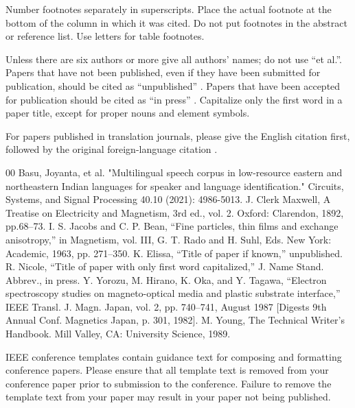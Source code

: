 \documentclass[conference]{IEEEtran}
\begin{document}
Number footnotes separately in superscripts. Place the actual footnote at 
the bottom of the column in which it was cited. Do not put footnotes in the 
abstract or reference list. Use letters for table footnotes.

Unless there are six authors or more give all authors' names; do not use 
``et al.''. Papers that have not been published, even if they have been 
submitted for publication, should be cited as ``unpublished'' \cite{b4}. Papers 
that have been accepted for publication should be cited as ``in press'' \cite{b5}. 
Capitalize only the first word in a paper title, except for proper nouns and 
element symbols.

For papers published in translation journals, please give the English 
citation first, followed by the original foreign-language citation \cite{b6}.

\begin{thebibliography}{00}
 Basu, Joyanta, et al. "Multilingual speech corpus in low-resource eastern and northeastern Indian languages for speaker and language identification." Circuits, Systems, and Signal Processing 40.10 (2021): 4986-5013.
 J. Clerk Maxwell, A Treatise on Electricity and Magnetism, 3rd ed., vol. 2. Oxford: Clarendon, 1892, pp.68--73.
 I. S. Jacobs and C. P. Bean, ``Fine particles, thin films and exchange anisotropy,'' in Magnetism, vol. III, G. T. Rado and H. Suhl, Eds. New York: Academic, 1963, pp. 271--350.
 K. Elissa, ``Title of paper if known,'' unpublished.
 R. Nicole, ``Title of paper with only first word capitalized,'' J. Name Stand. Abbrev., in press.
 Y. Yorozu, M. Hirano, K. Oka, and Y. Tagawa, ``Electron spectroscopy studies on magneto-optical media and plastic substrate interface,'' IEEE Transl. J. Magn. Japan, vol. 2, pp. 740--741, August 1987 [Digests 9th Annual Conf. Magnetics Japan, p. 301, 1982].
 M. Young, The Technical Writer's Handbook. Mill Valley, CA: University Science, 1989.
\end{thebibliography}
\vspace{12pt}
\color{red}
IEEE conference templates contain guidance text for composing and formatting conference papers. Please ensure that all template text is removed from your conference paper prior to submission to the conference. Failure to remove the template text from your paper may result in your paper not being published.
\end{document}
